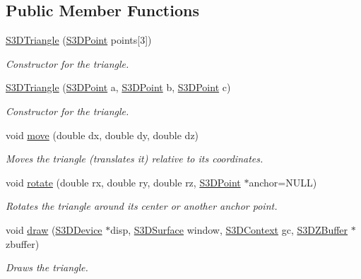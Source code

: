 \subsection*{Public Member Functions}
\begin{DoxyCompactItemize}
\item 
\hyperlink{class_s3_d_triangle_a2ac27d0814934c422e3fbf593c77014e}{S3DTriangle} (\hyperlink{class_s3_d_point}{S3DPoint} points\mbox{[}3\mbox{]})
\begin{DoxyCompactList}\small\item\em Constructor for the triangle. \item\end{DoxyCompactList}\item 
\hyperlink{class_s3_d_triangle_a6709f19586226831dc2a50466e3e669e}{S3DTriangle} (\hyperlink{class_s3_d_point}{S3DPoint} a, \hyperlink{class_s3_d_point}{S3DPoint} b, \hyperlink{class_s3_d_point}{S3DPoint} c)
\begin{DoxyCompactList}\small\item\em Constructor for the triangle. \item\end{DoxyCompactList}\item 
void \hyperlink{class_s3_d_triangle_a7f168122e4ed627fcb6489852a56982b}{move} (double dx, double dy, double dz)
\begin{DoxyCompactList}\small\item\em Moves the triangle (translates it) relative to its coordinates. \item\end{DoxyCompactList}\item 
void \hyperlink{class_s3_d_triangle_a3e739f6c9c176e58cb734db7328cf039}{rotate} (double rx, double ry, double rz, \hyperlink{class_s3_d_point}{S3DPoint} $\ast$anchor=NULL)
\begin{DoxyCompactList}\small\item\em Rotates the triangle around its center or another anchor point. \item\end{DoxyCompactList}\item 
void \hyperlink{class_s3_d_triangle_acf6924908c89d6bbc5af23769243beaf}{draw} (\hyperlink{types_8h_a25c0773a29204332721bde1b164d0b84}{S3DDevice} $\ast$disp, \hyperlink{types_8h_a4afc89c514af26434688c7e8b382ba5e}{S3DSurface} window, \hyperlink{types_8h_a46f30693e0040340e595d8228cc31779}{S3DContext} gc, \hyperlink{class_s3_d_z_buffer}{S3DZBuffer} $\ast$zbuffer)
\begin{DoxyCompactList}\small\item\em Draws the triangle. \item\end{DoxyCompactList}\item 

\end{DoxyCompactItemize}

